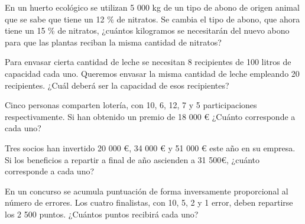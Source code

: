 \begin{ejer}
En un huerto ecológico se utilizan 5 000 kg de un tipo de abono de origen animal que se sabe que tiene un 12 \% de nitratos. Se cambia  el tipo de abono, que ahora tiene un 15 \% de nitratos, ¿cuántos kilogramos se necesitarán del nuevo abono para que las plantas reciban la misma cantidad de nitratos?
\end{ejer}

\begin{ejer}
Para envasar cierta cantidad de leche se necesitan 8 recipientes de 100 litros de capacidad cada uno. Queremos envasar la misma cantidad de leche empleando 20 recipientes. ¿Cuál deberá ser la capacidad de esos recipientes?
\end{ejer}

\begin{ejer}
Cinco personas comparten lotería, con 10, 6, 12, 7 y 5 participaciones respectivamente. Si han obtenido un premio de 18 000 € ¿Cuánto corresponde a cada uno?
\end{ejer}

\begin{ejer}
Tres socios han invertido 20 000 €, 34 000 € y 51 000 € este año en su empresa. Si los beneficios a repartir a final de año ascienden a 31 500€, ¿cuánto corresponde a cada uno?
\end{ejer}

\begin{ejer}
En un concurso se acumula puntuación de forma inversamente proporcional al número de errores. Los cuatro finalistas, con 10, 5, 2 y 1 error, deben repartirse los 2 500 puntos. ¿Cuántos puntos
recibirá cada uno?
\end{ejer}

